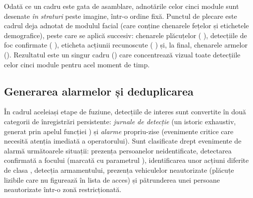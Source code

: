 \documentclass[../../main.tex]{subfiles}
\begin{document}
Odată ce un cadru este gata de asamblare, adnotările celor cinci module sunt desenate
\textit{în straturi} peste imagine, într-o ordine fixă. Punctul de plecare este cadrul deja
adnotat de modulul facial (care conține chenarele fețelor și etichetele demografice), peste care
se aplică succesiv: chenarele plăcuțelor ( ), detecțiile
de foc confirmate ( \linebreak {}), eticheta acțiunii recunoscute
( \linebreak \inlinecode{()}) și, la final, chenarele armelor
(). Rezultatul este un singur cadru
() care concentrează vizual toate detecțiile celor cinci module pentru
acel moment de timp.

\subsection{Generarea alarmelor și deduplicarea}
\label{subsec:alarme}

În cadrul aceleiași etape de fuziune, detecțiile de interes sunt convertite în două categorii de înregistrări persistente: \textit{jurnale de detecție} (un istoric exhaustiv, generat prin apelul funcției ) și \textit{alarme} propriu-zise (evenimente critice care necesită atenția imediată a operatorului). Sunt clasificate drept evenimente de alarmă următoarele situații: prezența persoanelor neidentificate, detectarea confirmată a focului (marcată cu parametrul ), identificarea unor acțiuni diferite de clasa , detecția armamentului, prezența vehiculelor neautorizate (plăcuțe lizibile care nu figurează în lista de acces) și pătrunderea unei persoane neautorizate într-o zonă restricționată.
\end{document}
